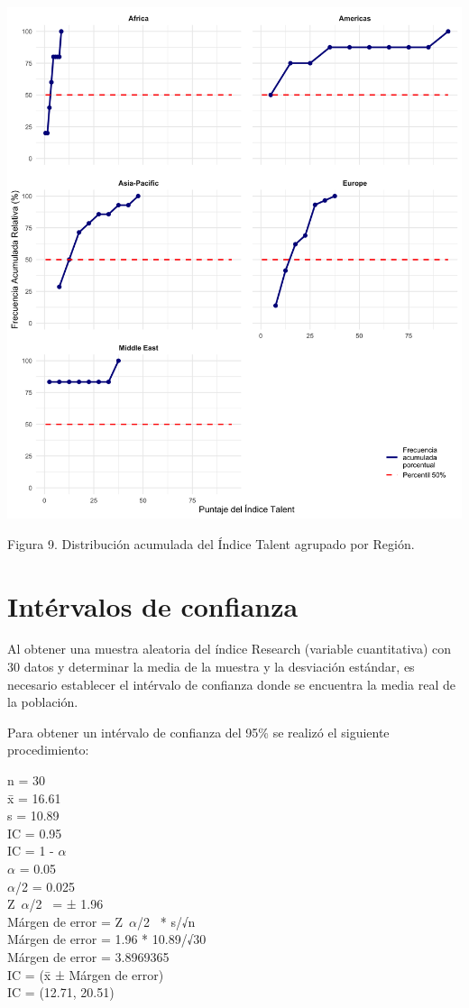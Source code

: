 \documentclass[
]{article}
\begin{document}
\begin{multicols}{2}
\begin{center}
\includegraphics[width=\linewidth]{figura9.png}
\end{center}
Figura 9. Distribución acumulada del Índice Talent agrupado por Región.

\section{Intérvalos de confianza}

Al obtener una muestra aleatoria del índice Research (variable cuantitativa) con 30 datos y determinar la media de la muestra y la desviación estándar, es necesario establecer el intérvalo de confianza donde se encuentra la media real de la población.

Para obtener un intérvalo de confianza del 95\% se realizó el siguiente procedimiento:




n = 30\\
x̄ = 16.61\\
s = 10.89\\
IC = 0.95\\
IC = 1 - $\alpha$\\
$\alpha$ = 0.05\\
$\alpha$/2 = 0.025\\
Z~$\alpha$/2~ = ± 1.96\\
Márgen de error = Z~$\alpha$/2~ * s/√n\\
Márgen de error = 1.96 * 10.89/√30\\
Márgen de error = 3.8969365\\
IC = (x̄ ± Márgen de error)\\
IC = (12.71,  20.51)\\


\end{multicols}
\end{document}
